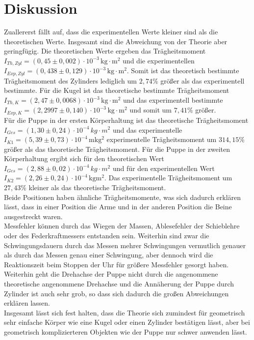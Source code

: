 \newpage
\section{Diskussion}
\label{sec:Diskussion}
Zuallererst fällt auf, dass die experimentellen Werte kleiner sind als die theoretischen Werte.
Insgesamt sind die Abweichung von der Theorie aber geringfügig. Die theoretischen Werte ergeben 
das Trägheitsmoment $I_{Th, Zyl} = \left(0{,}45 \pm 0{,}002 \right) \cdot 10^{-3} \, \mathrm{kg}\cdot\mathrm{m^2}$ und 
die experimentellen $I_{Exp, Zyl} = (0{,}438 \pm 0{,}129)\cdot 10^{-3}\, \mathrm{kg \cdot m^2}$. Somit ist das theoretisch bestimmte Trägheitsmoment
des Zylinders lediglich um $2{,}74\%$ größer als das experimentell bestimmte. Für die Kugel ist das theoretische bestimmte 
Trägheitsmoment $I_{Th, K} = \left(2{,}47 \pm 0{,}0068 \right) \cdot 10^{-3} \, \mathrm{kg}\cdot\mathrm{m^2}$ und das
experimentell bestimmte $I_{Exp, K} = (2{,}2997 \pm 0{,}140)\cdot 10^{-3} \, \mathrm{kg \cdot m^2}$ und somit um $7{,}41\%$ größer.\\
Für die Puppe in der ersten Körperhaltung ist das theoretische Trägheitsmoment $I_{Ges} = (1,30 \pm 0,24)\cdot 10^{-4} \, kg \cdot m^2$ und das experimentelle
$I_{K1} = (5{,}39 \pm 0{,}73) \cdot 10^{-4}\, \mathrm{mkg^2}$ experimentelle Trägheitsmoment um $314{,}15 \%$ größer als das theoretische Trägheitsmoment.
Für die Puppe in der zweiten Körperhaltung ergibt sich für den theoretischen Wert $I_{Ges} = (2,88 \pm 0,02)\cdot 10^{-4} \, kg \cdot m^2$ und für den experimentellen Wert $ I_{K2} = (2{,}26 \pm 0{,}24) \cdot 10^{-4}\, \mathrm{kgm^2}$. 
Das experimentelle Trägheitsmoment um $27{,}43 \%$ kleiner als das theoretische Trägheitsmoment.\\
Beide Positionen haben ähnliche Trägheitsmomente, was sich dadurch erklären lässt, dass in einer Position die Arme und in der anderen Position die Beine ausgestreckt waren.\\
Messfehler können durch das Wiegen der Massen, Ablesefehler der Schieblehre oder des Federkraftmessers entstanden sein. Weiterhin sind zwar die
Schwingungsdauern durch das Messen mehrer Schwingungen vermutlich genauer als durch das Messen genau einer Schwingung, aber dennoch wird die Reaktionszeit beim 
Stoppen der Uhr für größere Messfehler gesorgt haben.\\
Weiterhin geht die Drehachse der Puppe nicht durch die angenommene theoretische angenommene Drehachse und die Annäherung der Puppe durch Zylinder ist auch sehr grob,
so dass sich dadurch die großen Abweichungen erklären lassen.\\
Insgesamt lässt sich fest halten, dass die Theorie sich zumindest für geometrisch sehr einfache Körper wie eine Kugel oder einen Zylinder bestätigen lässt, aber bei geometrisch
komplizierteren Objekten wie der Puppe nur schwer anwenden lässt.

